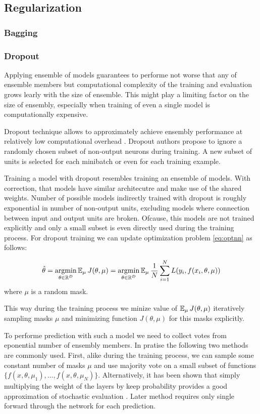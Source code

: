 \subsection{Regularization}

\subsubsection{Bagging}
\subsubsection{Dropout}

Applying ensemble of models guarantees to performe not worse that any of ensemble members but computational complexity of the training and evaluation grows learly with the size of ensemble. This might play a limiting factor on the size of ensembly, especially when training of even a single model is computationally expensive.

Dropout technique allows to approximately achieve ensembly performance at relatively low computational overhead \cite{Srivastava2014}.
Dropout authors propose to ignore a randomly chosen subset of non-output neurons during training. A new subset of units is selected for each minibatch or even for each training example.

Training a model with dropout resembles training an ensemble of models. With correction, that models have similar architecutre and make use of the shared weights. Number of possible models indirectly trained with dropout is roughly exponential in number of non-output units, excluding models where connection between input and output units are broken. Ofcause, this models are not trained explicitly and only a small subset is even directly used during the training process. For dropout training we can update optimization problem \ref{eq:optnn} as follows:

\begin{equation}\label{eq:optnndo}
  \hat{\theta} = \operatorname*{argmin}_{\theta \in \Bbb{R}^D} \operatorname{\mathbb{E}}_\mu J(\theta, \mu) = \operatorname*{argmin}_{\theta \in \Bbb{R}^D} \operatorname{\mathbb{E}}_\mu \frac{1}{N} \sum_{i=1}^{N} L(y_i, f(x_i, \theta, \mu))
\end{equation}
where $\mu$ is a random mask.

This way during the training process we minize value of $\operatorname{\mathbb{E}}_\mu J(\theta, \mu)$ iteratively sampling masks $\mu$ and minimizing function $J(\theta, \mu)$ for this masks explicitly.

To performe prediction with such a model we need to collect votes from eponential number of ensembly members.
In pratise the following two methods are commonly used. First, alike during the training process, we can sample some constant number of masks $\mu$ and use majority vote on a small subset of functions $\{f(x, \theta, \mu_1), \ldots, f(x, \theta, \mu_N)\}$. Alternatively, it has been shown that simply multiplying the weight of the layers by keep probability provides a good approximation of stochastic evaluation \cite{Srivastava2014}. Later method requires only single forward through the network for each prediction.

